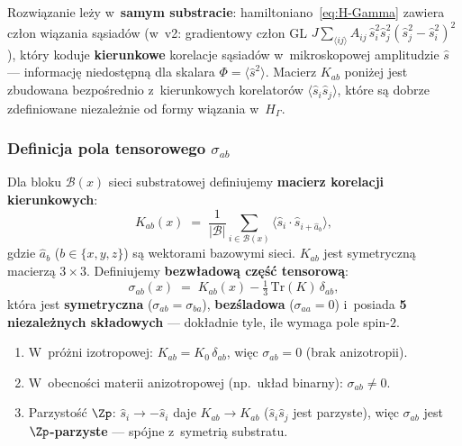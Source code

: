 Rozwi\k{a}zanie le\.zy w~\textbf{samym substracie}:
hamiltoniano~\eqref{eq:H-Gamma} zawiera cz\l{}on
wi\k{a}zania s\k{a}siad\'ow (w~v2: gradientowy cz\l{}on GL
$J \sum_{\langle ij\rangle} A_{ij}\,\hat{s}_i^2\hat{s}_j^2
(\hat{s}_j^2 - \hat{s}_i^2)^2$), kt\'ory koduje
\textbf{kierunkowe} korelacje s\k{a}siad\'ow w~mikroskopowej
amplitudzie $\hat{s}$ --- informacj\k{e} niedost\k{e}pn\k{a}
dla skalara $\Phi = \langle\hat{s}^2\rangle$. Macierz
$K_{ab}$ poni\.zej jest zbudowana bezpo\'srednio
z~kierunkowych korelator\'ow $\langle\hat{s}_i\hat{s}_j\rangle$,
kt\'ore s\k{a} dobrze zdefiniowane niezale\.znie od formy
wi\k{a}zania w~$H_\Gamma$.

\subsubsection{Definicja pola tensorowego $\sigma_{ab}$}

\begin{definition}\label{def:sigma-ab}
Dla bloku $\mathcal{B}(x)$ sieci substratowej definiujemy
\textbf{macierz korelacji kierunkowych}:
\begin{equation}\label{eq:K-ab}
  K_{ab}(x) \;=\;
  \frac{1}{|\mathcal{B}|}\sum_{i\in\mathcal{B}(x)}
  \langle\hat{s}_i\cdot\hat{s}_{i+\hat{a}_b}\rangle,
\end{equation}
gdzie $\hat{a}_b$ ($b \in \{x,y,z\}$) s\k{a} wektorami
bazowymi sieci. $K_{ab}$ jest symetryczn\k{a} macierz\k{a}
$3{\times}3$. Definiujemy \textbf{bezw\l{}adow\k{a}
cz\k{e}\'s\'c tensorow\k{a}}:
\begin{equation}\label{eq:sigma-def}
  \boxed{
    \sigma_{ab}(x)
    \;=\; K_{ab}(x) - \tfrac{1}{3}\,\mathrm{Tr}(K)\,\delta_{ab},
  }
\end{equation}
kt\'ora jest \textbf{symetryczna} ($\sigma_{ab} = \sigma_{ba}$),
\textbf{bez\'sladowa} ($\sigma_{aa} = 0$) i~posiada
\textbf{5 niezale\.znych sk\l{}adowych}
--- dok\l{}adnie tyle, ile wymaga pole spin-$2$.
\end{definition}

\begin{remark}
\begin{enumerate}[nosep]
  \item W~pr\'o\.zni izotropowej:
    $K_{ab} = K_0\,\delta_{ab}$, wi\k{e}c
    $\sigma_{ab} = 0$ (brak anizotropii).
  \item W~obecno\'sci materii anizotropowej
    (np.\ uk\l{}ad binarny): $\sigma_{ab} \neq 0$.
  \item Parzysto\'s\'c $\Zp$:
    $\hat{s}_i \to -\hat{s}_i$ daje
    $K_{ab} \to K_{ab}$ ($\hat{s}_i\hat{s}_j$ jest
    parzyste), wi\k{e}c $\sigma_{ab}$ jest
    \textbf{$\Zp$-parzyste} --- sp\'ojne
    z~symetri\k{a} substratu.
\end{enumerate}
\end{remark}

